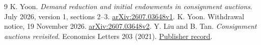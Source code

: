 \documentclass[11pt]{article}
\begin{document}
\begin{thebibliography}{9}
 K. Yoon. \emph{Demand reduction and initial endowments in consignment auctions}. July 2026, version 1, sections 2--3. \href{https://arxiv.org/html/2607.03648v1}{arXiv:2607.03648v1}.
 K. Yoon. Withdrawal notice, 19 November 2026. \href{https://arxiv.org/abs/2607.03648v2}{arXiv:2607.03648v2}.
 Y. Liu and B. Tan. \emph{Consignment auctions revisited}. Economics Letters 203 (2021). \href{https://www.sciencedirect.com/science/article/abs/pii/S0165176521001245}{Publisher record}.
\end{thebibliography}
\end{document}
